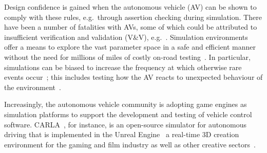 \documentclass[letterpaper, 10 pt, journal, twoside]{IEEEtran}
\begin{document}
Design confidence is gained when the autonomous vehicle (AV) can be shown to comply with these rules, e.g.\ through assertion checking during simulation. 
There have been a number of fatalities with AVs, some of which could be attributed to insufficient verification and validation (V\&V), e.g.~\cite{FatalityExample}. Simulation environments offer a means to explore the vast parameter space in a safe and efficient manner~\cite{korosec2019waymo} without the need for millions of miles of costly on-road testing~\cite{kalra2016driving}. In particular, simulations can be biased to increase the frequency at which otherwise rare events occur~\cite{Koopman2018}; this includes testing how the AV reacts to unexpected behaviour of the environment~\cite{RobustnessAutonomy}. 

Increasingly, the autonomous vehicle community is adopting game engines as simulation platforms to support the development and testing of vehicle control software. 
%
CARLA~\cite{carla_main_website}, for instance, is an open-source simulator for autonomous driving that is implemented in the Unreal Engine~\cite{UE4_main_website} a real-time 3D creation environment for the gaming and film industry as well as other creative sectors~\cite{CARLA_paper}. 
\end{document}
